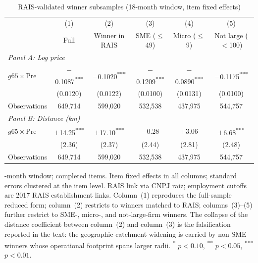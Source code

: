 \documentclass[12pt]{article}
\providecommand{\sym}[1]{\textsuperscript{#1}}
\begin{document}
\begin{table}[!htbp]
\centering
\begin{threeparttable}
\caption{RAIS-validated winner subsamples (18-month window, item fixed effects)}
\label{tab:app_rais_validation}
\footnotesize
\setlength{\tabcolsep}{4pt}
\begin{tabular}{lccccc}
\toprule
 & (1) & (2) & (3) & (4) & (5) \\
 & Full & Winner in RAIS & SME ($\leq$49) & Micro ($\leq$9) & Not large ($<$100) \\
\midrule
\multicolumn{6}{l}{\textit{Panel A: Log price}} \\
$g65 \times \mathrm{Pre}$
 & $-$0.1087\sym{***} & $-$0.1020\sym{***} & $-$0.1209\sym{***} & $-$0.0890\sym{***} & $-$0.1175\sym{***} \\
 & (0.0120) & (0.0122) & (0.0100) & (0.0131) & (0.0100) \\
Observations
 & 649,714 & 599,020 & 532,538 & 437,975 & 544,757 \\
\midrule
\multicolumn{6}{l}{\textit{Panel B: Distance (km)}} \\
$g65 \times \mathrm{Pre}$
 & $+$14.25\sym{***} & $+$17.10\sym{***} & $-$0.28 & $+$3.06 & $+$6.68\sym{***} \\
 & (2.36) & (2.37) & (2.44) & (2.81) & (2.48) \\
Observations
 & 649,714 & 599,020 & 532,538 & 437,975 & 544,757 \\
\bottomrule
\end{tabular}
\begin{tablenotes}\footnotesize
\item \structuralWindowM-month window; completed items. Item fixed effects
in all columns; standard errors clustered at the item level. RAIS link via
CNPJ raiz; employment cutoffs are 2017 RAIS establishment links. Column~(1)
reproduces the full-sample reduced form; column~(2) restricts to winners
matched to RAIS; columns~(3)--(5) further restrict to SME-, micro-, and
not-large-firm winners. The collapse of the distance coefficient between
column~(2) and column~(3) is the falsification reported in the text:
the geographic-catchment widening is carried by non-SME winners whose
operational footprint spans larger radii. \sym{*} $p<0.10$,
\sym{**} $p<0.05$, \sym{***} $p<0.01$.
\end{tablenotes}
\end{threeparttable}
\end{table}
\end{document}
